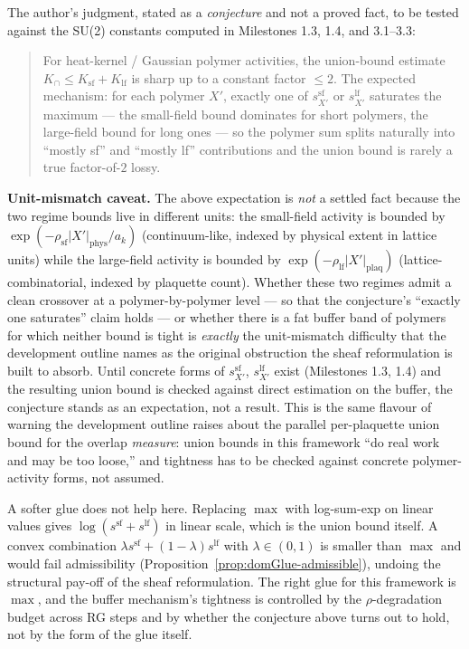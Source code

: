 \begin{conjecture}
\label{conj:gaussian-sharpness}
The author's judgment, stated as a \emph{conjecture} and not a proved fact, to be tested against the SU(2) constants computed in Milestones 1.3, 1.4, and 3.1--3.3:
\begin{quote}
For heat-kernel / Gaussian polymer activities, the union-bound estimate $K_{\cap} \le K_{\mathrm{sf}} + K_{\mathrm{lf}}$ is sharp up to a constant factor $\le 2$.  The expected mechanism: for each polymer $X'$, exactly one of $s^{\mathrm{sf}}_{X'}$ or $s^{\mathrm{lf}}_{X'}$ saturates the maximum --- the small-field bound dominates for short polymers, the large-field bound for long ones --- so the polymer sum splits naturally into ``mostly sf'' and ``mostly lf'' contributions and the union bound is rarely a true factor-of-$2$ lossy.
\end{quote}

\textbf{Unit-mismatch caveat.}  The above expectation is \emph{not} a settled fact because the two regime bounds live in different units: the small-field activity is bounded by $\exp(-\rho_{\mathrm{sf}} |X'|_{\mathrm{phys}}/a_k)$ (continuum-like, indexed by physical extent in lattice units) while the large-field activity is bounded by $\exp(-\rho_{\mathrm{lf}} |X'|_{\mathrm{plaq}})$ (lattice-combinatorial, indexed by plaquette count).  Whether these two regimes admit a clean crossover at a polymer-by-polymer level --- so that the conjecture's ``exactly one saturates'' claim holds --- or whether there is a fat buffer band of polymers for which neither bound is tight is \emph{exactly} the unit-mismatch difficulty that the development outline names as the original obstruction the sheaf reformulation is built to absorb.  Until concrete forms of $s^{\mathrm{sf}}_{X'}$, $s^{\mathrm{lf}}_{X'}$ exist (Milestones 1.3, 1.4) and the resulting union bound is checked against direct estimation on the buffer, the conjecture stands as an expectation, not a result.  This is the same flavour of warning the development outline raises about the parallel per-plaquette union bound for the overlap \emph{measure}: union bounds in this framework ``do real work and may be too loose,'' and tightness has to be checked against concrete polymer-activity forms, not assumed.

A softer glue does not help here.  Replacing $\max$ with log-sum-exp on linear values gives $\log(s^{\mathrm{sf}} + s^{\mathrm{lf}})$ in linear scale, which is the union bound itself.  A convex combination $\lambda s^{\mathrm{sf}} + (1-\lambda) s^{\mathrm{lf}}$ with $\lambda \in (0,1)$ is smaller than $\max$ and would fail admissibility (Proposition~\ref{prop:domGlue-admissible}), undoing the structural pay-off of the sheaf reformulation.  The right glue for this framework is $\max$, and the buffer mechanism's tightness is controlled by the $\rho$-degradation budget across RG steps and by whether the conjecture above turns out to hold, not by the form of the glue itself.


\end{conjecture}
